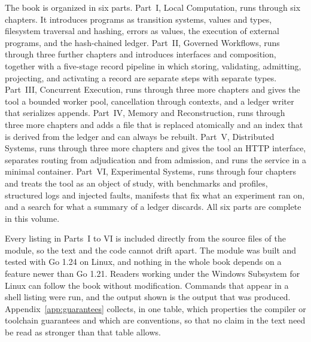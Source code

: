 The book is organized in six parts. Part~I, Local Computation, runs through six chapters. It introduces programs as transition systems, values and types, filesystem traversal and hashing, errors as values, the execution of external programs, and the hash-chained ledger. Part~II, Governed Workflows, runs through three further chapters and introduces interfaces and composition, together with a five-stage record pipeline in which storing, validating, admitting, projecting, and activating a record are separate steps with separate types. Part~III, Concurrent Execution, runs through three more chapters and gives the tool a bounded worker pool, cancellation through contexts, and a ledger writer that serializes appends. Part~IV, Memory and Reconstruction, runs through three more chapters and adds a file that is replaced atomically and an index that is derived from the ledger and can always be rebuilt. Part~V, Distributed Systems, runs through three more chapters and gives the tool an HTTP interface, separates routing from adjudication and from admission, and runs the service in a minimal container. Part~VI, Experimental Systems, runs through four chapters and treats the tool as an object of study, with benchmarks and profiles, structured logs and injected faults, manifests that fix what an experiment ran on, and a search for what a summary of a ledger discards. All six parts are complete in this volume.

Every listing in Parts~I to VI is included directly from the source files of the \golab{} module, so the text and the code cannot drift apart. The module was built and tested with Go 1.24 on Linux, and nothing in the whole book depends on a feature newer than Go 1.21. Readers working under the Windows Subsystem for Linux can follow the book without modification. Commands that appear in a shell listing were run, and the output shown is the output that was produced. Appendix~\ref{app:guarantees} collects, in one table, which properties the compiler or toolchain guarantees and which are conventions, so that no claim in the text need be read as stronger than that table allows.
